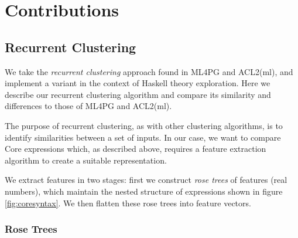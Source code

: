 \section{Contributions}
\label{sec:contributions}

\subsection{Recurrent Clustering}
\label{sec:recurrentclustering}

We take the \emph{recurrent clustering} approach found in ML4PG and ACL2(ml), and implement a variant in the context of Haskell theory exploration. Here we describe our recurrent clustering algorithm and compare its similarity and differences to those of ML4PG and ACL2(ml).

\iffalse TODO: Much of this discussion reads as a minor implementation solution rather than an overview of the whole method \fi

\iffalse TODO: Focus the section more on the problem of identifiers, and how recurrent clustering uses clustering as part of feature extraction to solve this \fi

\iffalse TODO: Maybe present the translation from trees to matrices, to vectors first; leaving the conversion of terms to features until afterwards; similar to how ML4PG uses [foo] to mean ``the feature corresponding to foo, whatever that might be'' \fi

\iffalse TODO: Maybe present recurrent clustering in a ``naive'' way: define the conversion function ``[]'' recursively. Leave the dependency-ordering, etc. for the Algorithm section, as a way of ``building up to'' the result, which avoids the inefficiencies of recursing. \fi

The purpose of recurrent clustering, as with other clustering algorithms, is to identify similarities between a set of inputs. In our case, we want to compare Core expressions which, as described above, requires a feature extraction algorithm to create a suitable representation.

We extract features in two stages: first we construct \emph{rose trees} of features (real numbers), which maintain the nested structure of expressions shown in figure \ref{fig:coresyntax}. We then flatten these rose trees into feature vectors.

\subsubsection{Rose Trees}


